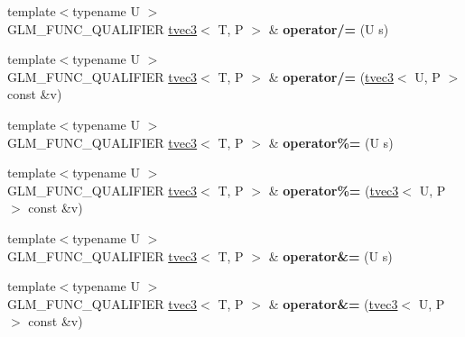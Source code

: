 \begin{DoxyCompactItemize}
\item 
\hypertarget{structglm_1_1detail_1_1tvec3_af3e883a1150dc47126e797bd912c20a4}{{\footnotesize template$<$typename U $>$ }\\G\-L\-M\-\_\-\-F\-U\-N\-C\-\_\-\-Q\-U\-A\-L\-I\-F\-I\-E\-R \hyperlink{structglm_1_1detail_1_1tvec3}{tvec3}$<$ T, P $>$ \& {\bfseries operator/=} (U s)}\label{structglm_1_1detail_1_1tvec3_af3e883a1150dc47126e797bd912c20a4}

\item 
\hypertarget{structglm_1_1detail_1_1tvec3_aa8a3e4ddca435bf79743f2eaf7565258}{{\footnotesize template$<$typename U $>$ }\\G\-L\-M\-\_\-\-F\-U\-N\-C\-\_\-\-Q\-U\-A\-L\-I\-F\-I\-E\-R \hyperlink{structglm_1_1detail_1_1tvec3}{tvec3}$<$ T, P $>$ \& {\bfseries operator/=} (\hyperlink{structglm_1_1detail_1_1tvec3}{tvec3}$<$ U, P $>$ const \&v)}\label{structglm_1_1detail_1_1tvec3_aa8a3e4ddca435bf79743f2eaf7565258}

\item 
\hypertarget{structglm_1_1detail_1_1tvec3_aaaf69a6d0cf17237a58eeb07b594c9a7}{{\footnotesize template$<$typename U $>$ }\\G\-L\-M\-\_\-\-F\-U\-N\-C\-\_\-\-Q\-U\-A\-L\-I\-F\-I\-E\-R \hyperlink{structglm_1_1detail_1_1tvec3}{tvec3}$<$ T, P $>$ \& {\bfseries operator\%=} (U s)}\label{structglm_1_1detail_1_1tvec3_aaaf69a6d0cf17237a58eeb07b594c9a7}

\item 
\hypertarget{structglm_1_1detail_1_1tvec3_aa8a52f5d1ee2dc56c4b62f70408d9c5f}{{\footnotesize template$<$typename U $>$ }\\G\-L\-M\-\_\-\-F\-U\-N\-C\-\_\-\-Q\-U\-A\-L\-I\-F\-I\-E\-R \hyperlink{structglm_1_1detail_1_1tvec3}{tvec3}$<$ T, P $>$ \& {\bfseries operator\%=} (\hyperlink{structglm_1_1detail_1_1tvec3}{tvec3}$<$ U, P $>$ const \&v)}\label{structglm_1_1detail_1_1tvec3_aa8a52f5d1ee2dc56c4b62f70408d9c5f}

\item 
\hypertarget{structglm_1_1detail_1_1tvec3_a0e63f52ae42a99bd67153078e5fd7e95}{{\footnotesize template$<$typename U $>$ }\\G\-L\-M\-\_\-\-F\-U\-N\-C\-\_\-\-Q\-U\-A\-L\-I\-F\-I\-E\-R \hyperlink{structglm_1_1detail_1_1tvec3}{tvec3}$<$ T, P $>$ \& {\bfseries operator\&=} (U s)}\label{structglm_1_1detail_1_1tvec3_a0e63f52ae42a99bd67153078e5fd7e95}

\item 
\hypertarget{structglm_1_1detail_1_1tvec3_ab7fe55bda5ac440876683f971c38e265}{{\footnotesize template$<$typename U $>$ }\\G\-L\-M\-\_\-\-F\-U\-N\-C\-\_\-\-Q\-U\-A\-L\-I\-F\-I\-E\-R \hyperlink{structglm_1_1detail_1_1tvec3}{tvec3}$<$ T, P $>$ \& {\bfseries operator\&=} (\hyperlink{structglm_1_1detail_1_1tvec3}{tvec3}$<$ U, P $>$ const \&v)}\label{structglm_1_1detail_1_1tvec3_ab7fe55bda5ac440876683f971c38e265}


\end{DoxyCompactItemize}
